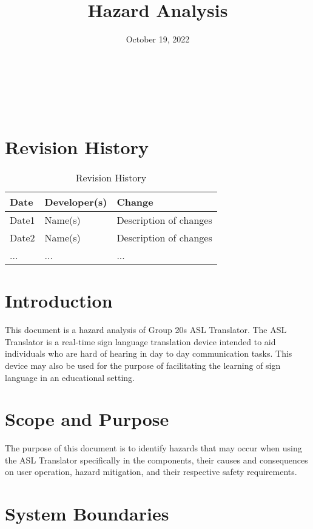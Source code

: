 \documentclass{article}
\title{Hazard Analysis\\\progname}
\author{\authname}
\date{October 19, 2022}
\begin{document}
\maketitle

~\newpage

\tableofcontents

~\newpage

\section*{Revision History}
\begin{table}[hp]
\caption{Revision History} \label{TblRevisionHistory}
\begin{tabularx}{\textwidth}{llX}
\toprule
\textbf{Date} & \textbf{Developer(s)} & \textbf{Change}\\
\midrule
Date1 & Name(s) & Description of changes\\
Date2 & Name(s) & Description of changes\\
... & ... & ...\\
\bottomrule
\end{tabularx}
\end{table}

\newpage
\textheight 9in

\section{Introduction}

This document is a hazard analysis of Group 20\textquotesingle s ASL Translator. The ASL Translator is a real-time sign language translation device intended to aid 
individuals who are hard of hearing in day to day communication tasks. This device may also be used for the purpose of facilitating the learning of 
sign language in an educational setting.\\

\section{Scope and Purpose}

The purpose of this document is to identify hazards that may occur when using the ASL Translator specifically in the components, their causes and consequences on user 
operation, hazard mitigation, and their respective safety requirements.\\

\section{System Boundaries}
\end{document}
